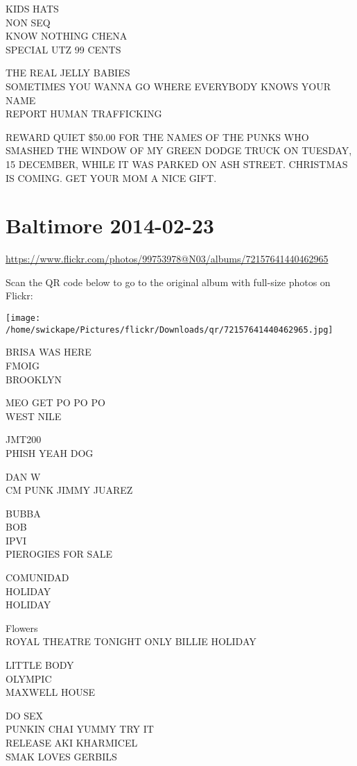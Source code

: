 \documentclass[10pt,letterpaper]{article}
\begin{document}
KIDS HATS\\
NON SEQ\\
KNOW NOTHING CHENA\\
SPECIAL UTZ 99 CENTS

THE REAL JELLY BABIES\\
SOMETIMES YOU WANNA GO WHERE EVERYBODY KNOWS YOUR NAME\\
REPORT HUMAN TRAFFICKING

REWARD QUIET \$50.00 FOR THE NAMES OF THE PUNKS WHO SMASHED THE WINDOW OF MY GREEN DODGE TRUCK ON TUESDAY, 15 DECEMBER, WHILE IT WAS PARKED ON ASH STREET.  CHRISTMAS IS COMING.  GET YOUR MOM A NICE GIFT.
\pagebreak

\section*{Baltimore 2014-02-23}

\url{https://www.flickr.com/photos/99753978@N03/albums/72157641440462965}

Scan the QR code below to go to the original album with full-size photos on Flickr:

\texttt{[image: /home/swickape/Pictures/flickr/Downloads/qr/72157641440462965.jpg]}
\pagebreak

BRISA WAS HERE\\
FMOIG\\
BROOKLYN

MEO GET PO PO PO\\
WEST NILE

JMT200\\
PHISH YEAH DOG

DAN W\\
CM PUNK JIMMY JUAREZ

BUBBA\\
BOB\\
IPVI\\
PIEROGIES FOR SALE

COMUNIDAD\\
HOLIDAY\\
HOLIDAY

Flowers\\
ROYAL THEATRE TONIGHT ONLY BILLIE HOLIDAY

LITTLE BODY\\
OLYMPIC\\
MAXWELL HOUSE

DO SEX\\
PUNKIN CHAI YUMMY TRY IT\\
RELEASE AKI KHARMICEL\\
SMAK LOVES GERBILS
\end{document}

